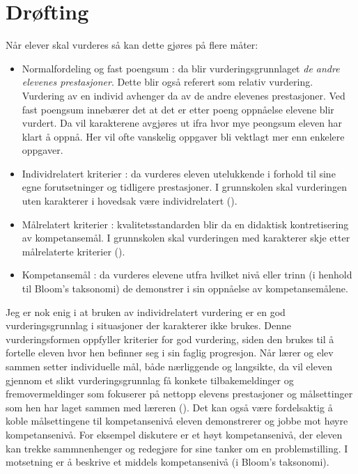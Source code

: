 \documentclass[main.tex]{subfiles}
\begin{document}
\section*{Drøfting}
Når elever skal vurderes så kan dette gjøres på flere måter:
\begin{itemize}
\item Normalfordeling og fast poengsum : da blir vurderingsgrunnlaget \emph{de andre elevenes prestasjoner}. 
Dette blir også referert som relativ vurdering. Vurdering av en individ avhenger da av de andre
elevenes prestasjoner. Ved fast poengsum innebærer det at det er etter poeng oppnåelse elevene blir vurdert. 
Da vil karakterene avgjøres ut ifra hvor mye peongsum eleven har klart å oppnå. Her vil ofte vanskelig oppgaver
bli vektlagt mer enn enkelere oppgaver.
\item Individrelatert kriterier : da vurderes eleven utelukkende i forhold til sine egne forutsetninger
og tidligere prestasjoner. I grunnskolen skal vurderingen uten karakterer i hovedsak være 
individrelatert  ().
\item Målrelatert kriterier : kvalitetsstandarden blir da en didaktisk kontretisering av kompetansemål.
 I grunnskolen skal vurderingen med karakterer skje etter målrelaterte kriterier ().
\item Kompetansemål : da vurderes elevene utfra hvilket nivå eller trinn (i henhold til Bloom's taksonomi) 
                      de demonstrer i sin oppnåelse av kompetansemålene.
\end{itemize}
Jeg er nok enig i at bruken av individrelatert vurdering er en god vurderingsgrunnlag i situasjoner
der karakterer ikke brukes. Denne vurderingsformen oppfyller kriterier for god vurdering, siden den brukes til å 
fortelle eleven hvor hen befinner seg i sin faglig progresjon. Når lærer og elev sammen setter individuelle mål, både 
nærliggende og langsikte, da vil eleven gjennom et slikt vurderingsgrunnlag få konkete tilbakemeldinger og 
fremovermeldinger som fokuserer på nettopp elevens prestasjoner og målsettinger som hen har laget sammen med
læreren (). Det kan også være fordelsaktig å koble målsettingene til kompetansenivå eleven 
demonstrerer og jobbe mot høyre kompetansenivå. For eksempel diskutere er et høyt kompetansenivå, der eleven 
kan trekke sammnenhenger og redegjøre for sine tanker om en problemstilling. I motsetning er å beskrive et middels 
kompetansenivå (i Bloom's taksonomi).
\end{document}
